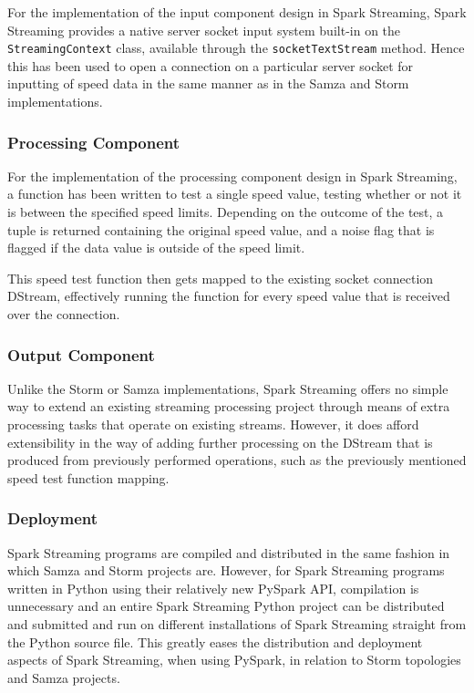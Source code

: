 For the implementation of the input component design in Spark Streaming, Spark Streaming provides a native server socket input
system built-in on the \texttt{StreamingContext} class, available through the \texttt{socketTextStream} method. Hence
this has been used to open a connection on a particular server socket for inputting of speed data in the same manner as in the
Samza and Storm implementations.

\subsubsection{Processing Component}

For the implementation of the processing component design in Spark Streaming, a function has been written to test a single
speed value, testing whether or not it is between the specified speed limits. Depending on the outcome of the test,
a tuple is returned containing the original speed value, and a noise flag that is flagged if the data value is outside
of the speed limit.

This speed test function then gets mapped to the existing socket connection DStream, effectively running the function
for every speed value that is received over the connection.

\subsubsection{Output Component}

Unlike the Storm or Samza implementations, Spark Streaming offers no simple way to extend an existing streaming processing
project through means of extra processing tasks that operate on existing streams. However, it does afford extensibility
in the way of adding further processing on the DStream that is produced from previously performed operations, such
as the previously mentioned speed test function mapping.

\subsubsection{Deployment}

Spark Streaming programs are compiled and distributed in the same fashion in which Samza and Storm projects are. However,
for Spark Streaming programs written in Python using their relatively new PySpark API, compilation is unnecessary and an entire Spark
Streaming Python project can be distributed and submitted and run on different installations of Spark Streaming straight
from the Python source file. This greatly eases the distribution and deployment aspects of Spark Streaming, when using
PySpark, in relation to Storm topologies and Samza projects.

